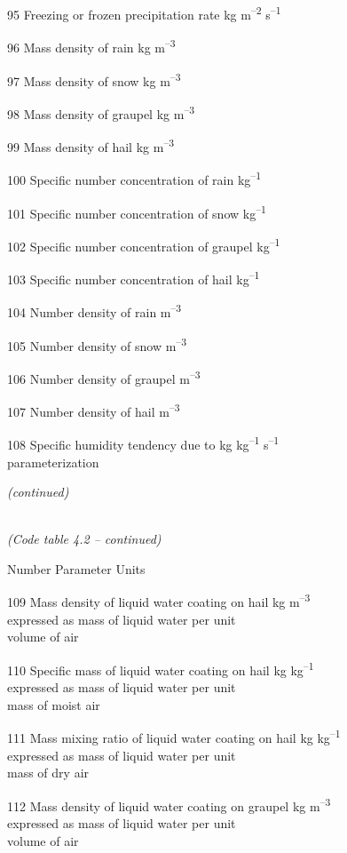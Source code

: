 95 Freezing or frozen precipitation rate kg m\textsuperscript{--2} s\textsuperscript{--1}

96 Mass density of rain kg m\textsuperscript{--3}

97 Mass density of snow kg m\textsuperscript{--3}

98 Mass density of graupel kg m\textsuperscript{--3}

99 Mass density of hail kg m\textsuperscript{--3}

100 Specific number concentration of rain kg\textsuperscript{--1}

101 Specific number concentration of snow kg\textsuperscript{--1}

102 Specific number concentration of graupel kg\textsuperscript{--1}

103 Specific number concentration of hail kg\textsuperscript{--1}

104 Number density of rain m\textsuperscript{--3}

105 Number density of snow m\textsuperscript{--3}

106 Number density of graupel m\textsuperscript{--3}

107 Number density of hail m\textsuperscript{--3}

108 Specific humidity tendency due to kg kg\textsuperscript{--1} s\textsuperscript{--1}\\
parameterization

\emph{(continued)}

\emph{\\
(Code table 4.2 -- continued)}

Number Parameter Units

109 Mass density of liquid water coating on hail kg m\textsuperscript{--3}\\
expressed as mass of liquid water per unit\\
volume of air

110 Specific mass of liquid water coating on hail kg kg\textsuperscript{--1}\\
expressed as mass of liquid water per unit\\
mass of moist air

111 Mass mixing ratio of liquid water coating on hail kg kg\textsuperscript{--1}\\
expressed as mass of liquid water per unit\\
mass of dry air

112 Mass density of liquid water coating on graupel kg m\textsuperscript{--3}\\
expressed as mass of liquid water per unit\\
volume of air

